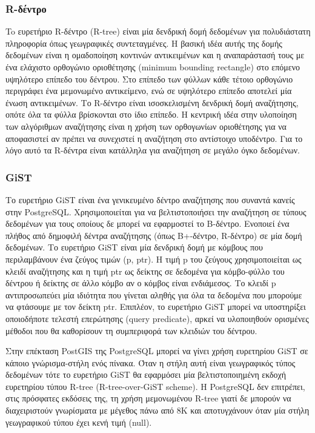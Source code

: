 \subsubsection{R-δέντρο}

To ευρετήριο R-δέντρο (R-tree) είναι μία δενδρική δομή δεδομένων για πολυδιάστατη πληροφορία όπως γεωγραφικές συντεταγμένες. Η βασική ιδέα αυτής της δομής δεδομένων είναι η 
ομαδοποίηση κοντινών αντικειμένων και η αναπαράστασή τους με ένα ελάχιστο ορθογώνιο οριοθέτησης (minimum bounding rectangle) στο επόμενο υψηλότερο επίπεδο του δέντρου. 
Στο επίπεδο των φύλλων κάθε τέτοιο ορθογώνιο περιγράφει ένα μεμονωμένο αντικείμενο, ενώ σε υψηλότερο επίπεδο αποτελεί μία ένωση αντικειμένων. Το R-δέντρο είναι 
ισοσκελισμένη δενδρική δομή αναζήτησης, οπότε όλα τα φύλλα βρίσκονται στο ίδιο επίπεδο. Η κεντρική ιδέα στην υλοποίηση των αλγόριθμων αναζήτησης είναι η χρήση των 
ορθογωνίων οριοθέτησης για να αποφασιστεί αν πρέπει να συνεχιστεί η αναζήτηση στο αντίστοιχο υποδέντρο. Για το λόγο αυτό τα R-δέντρα είναι κατάλληλα για αναζήτηση σε μεγάλο όγκο 
δεδομένων. 

\subsubsection{GiST}

Το ευρετήριο GiST είναι ένα γενικευμένο δέντρο αναζήτησης που συναντά κανείς στην PostgreSQL. Χρησιμοποιείται για να βελτιστοποιήσει την αναζήτηση σε τύπους δεδομένων 
για τους οποίους δε μπορεί να 
εφαρμοστεί το Β-δέντρο. Ενοποιεί ένα πλήθος από δημοφιλή δέντρα αναζήτησης (όπως B+-δέντρο, R-δέντρο) σε μία δομή δεδομένων. Το ευρετήριο GiST 
είναι μία δενδρική δομή με κόμβους που περιλαμβάνουν ένα ζεύγος τιμών (p, ptr). Η τιμή p του ζεύγους χρησιμοποιείται ως κλειδί αναζήτησης και η τιμή ptr ως δείκτης σε 
δεδομένα για κόμβο-φύλλο του δέντρου ή δείκτης σε άλλο κόμβο αν ο κόμβος είναι ενδιάμεσος. Το κλειδί p αντιπροσωπεύει μία ιδιότητα που γίνεται αληθής για όλα τα 
δεδομένα που μπορούμε να φτάσουμε με τον δείκτη ptr. Επιπλέον, το ευρετήριο GiST μπορεί να υποστηρίξει οποιοδήποτε 
τελεστή επερώτησης (query predicate), αρκεί να υλοποιηθούν ορισμένες μέθοδοι που θα καθορίσουν τη συμπεριφορά των κλειδιών του δέντρου.

Στην επέκταση PostGIS της PostgreSQL μπορεί να γίνει χρήση ευρετηρίου GiST σε κάποιο γνώρισμα-στήλη ενός πίνακα. Όταν η στήλη αυτή είναι γεωγραφικός τύπος δεδομένων τότε 
το ευρετήριο GiST θα εφαρμόσει μία βελτιστοποιημένη εκδοχή ευρετηρίου τύπου R-tree (R-tree-over-GiST scheme). H PostgreSQL δεν επιτρέπει, στις πρόσφατες εκδόσεις της, 
τη χρήση μεμονωμένου R-tree γιατί δε μπορούν να διαχειριστούν γνωρίσματα με μέγεθος πάνω από 8Κ και αποτυγχάνουν όταν μία στήλη γεωγραφικού τύπου έχει κενή τιμή (null).

